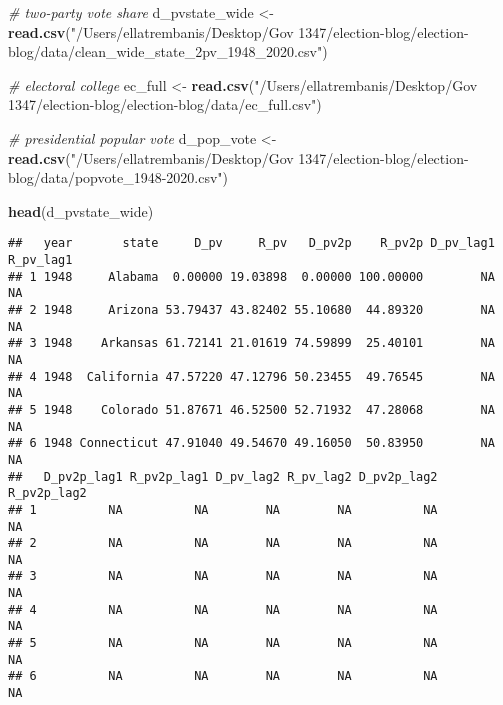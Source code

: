 \documentclass[
]{article}
\newenvironment{Shaded}{\begin{snugshade}}{\end{snugshade}}
\newcommand{\CommentTok}[1]{\textcolor[rgb]{0.56,0.35,0.01}{\textit{#1}}}
\newcommand{\FunctionTok}[1]{\textcolor[rgb]{0.13,0.29,0.53}{\textbf{#1}}}
\newcommand{\NormalTok}[1]{#1}
\newcommand{\OtherTok}[1]{\textcolor[rgb]{0.56,0.35,0.01}{#1}}
\newcommand{\StringTok}[1]{\textcolor[rgb]{0.31,0.60,0.02}{#1}}
\begin{document}
\begin{Shaded}
\begin{Highlighting}[]
\CommentTok{\# two{-}party vote share}
\NormalTok{d\_pvstate\_wide }\OtherTok{\textless{}{-}} \FunctionTok{read.csv}\NormalTok{(}\StringTok{"/Users/ellatrembanis/Desktop/Gov 1347/election{-}blog/election{-}blog/data/clean\_wide\_state\_2pv\_1948\_2020.csv"}\NormalTok{)}

\CommentTok{\# electoral college}
\NormalTok{ec\_full }\OtherTok{\textless{}{-}} \FunctionTok{read.csv}\NormalTok{(}\StringTok{"/Users/ellatrembanis/Desktop/Gov 1347/election{-}blog/election{-}blog/data/ec\_full.csv"}\NormalTok{)}

\CommentTok{\# presidential popular vote}
\NormalTok{d\_pop\_vote }\OtherTok{\textless{}{-}} \FunctionTok{read.csv}\NormalTok{(}\StringTok{"/Users/ellatrembanis/Desktop/Gov 1347/election{-}blog/election{-}blog/data/popvote\_1948{-}2020.csv"}\NormalTok{)}
\end{Highlighting}
\end{Shaded}

\begin{Shaded}
\begin{Highlighting}[]
\FunctionTok{head}\NormalTok{(d\_pvstate\_wide)}
\end{Highlighting}
\end{Shaded}

\begin{verbatim}
##   year       state     D_pv     R_pv   D_pv2p    R_pv2p D_pv_lag1 R_pv_lag1
## 1 1948     Alabama  0.00000 19.03898  0.00000 100.00000        NA        NA
## 2 1948     Arizona 53.79437 43.82402 55.10680  44.89320        NA        NA
## 3 1948    Arkansas 61.72141 21.01619 74.59899  25.40101        NA        NA
## 4 1948  California 47.57220 47.12796 50.23455  49.76545        NA        NA
## 5 1948    Colorado 51.87671 46.52500 52.71932  47.28068        NA        NA
## 6 1948 Connecticut 47.91040 49.54670 49.16050  50.83950        NA        NA
##   D_pv2p_lag1 R_pv2p_lag1 D_pv_lag2 R_pv_lag2 D_pv2p_lag2 R_pv2p_lag2
## 1          NA          NA        NA        NA          NA          NA
## 2          NA          NA        NA        NA          NA          NA
## 3          NA          NA        NA        NA          NA          NA
## 4          NA          NA        NA        NA          NA          NA
## 5          NA          NA        NA        NA          NA          NA
## 6          NA          NA        NA        NA          NA          NA
\end{verbatim}
\end{document}

